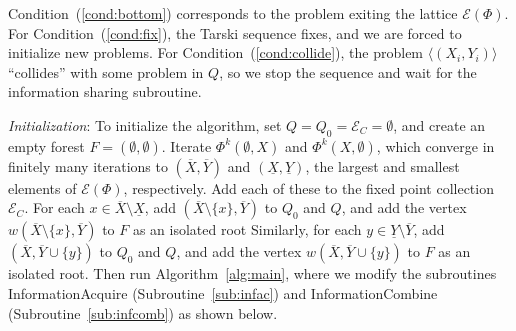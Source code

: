 \documentclass[11pt,reqno]{amsart}
\theoremstyle{definition}
\numberwithin{equation}{section}
\newcommand{\ol}{\overline}
\newcommand{\ul}{\underline}
\newcommand{\lag}{\langle}
\newcommand{\rag}{\rangle}
\newcommand{\fix}{\mathcal{E}}
\newcommand{\acto}{Q_0}
\newcommand{\act}{Q}
\newcommand{\forest}{F}
\newcommand{\fixfind}{\mathcal{E}_C}
\newcommand{\topx}{\ol{X}}
\newcommand{\topy}{\ol{Y}}
\newcommand{\botx}{\ul{X}}
\newcommand{\boty}{\ul{Y}}
\begin{document}
Condition~(\ref{cond:bottom}) corresponds to the problem exiting the lattice $\fix(\Phi)$. 
For Condition~(\ref{cond:fix}), the Tarski sequence fixes, and we are forced to initialize new problems.
For Condition~(\ref{cond:collide}), the problem $\lag (X_i, Y_i) \rag$ ``collides'' with some problem in $\act$, so we stop the sequence and wait for the information sharing subroutine.

\emph{Initialization}: To initialize the algorithm, set $\act = \acto = \fixfind = \emptyset$, and create an empty forest $\forest = (\emptyset,\emptyset)$.
Iterate $\Phi^k(\emptyset,X)$ and $\Phi^k(X, \emptyset)$, which converge in finitely many iterations to $(\topx, \topy)$ and $(\botx,\boty)$, the largest and smallest elements of $\fix(\Phi)$, respectively.
Add each of these to the fixed point collection $\fixfind$.
For each $x \in \topx \setminus \botx$, add $(\topx \setminus \{x\}, \topy)$ to $\acto$ and $\act$, and add the vertex $w(\topx \setminus \{x\}, \topy)$ to $\forest$ as an isolated root
Similarly, for each $y \in \boty \setminus \topy$, add $(\topx, \topy \cup \{y\})$ to $\acto$ and $\act$, and add the vertex $w(\topx, \topy \cup \{y\})$ to $\forest$ as an isolated root.
Then run Algorithm~\ref{alg:main}, where we modify the subroutines InformationAcquire (Subroutine~\ref{sub:infac}) and InformationCombine (Subroutine~\ref{sub:infcomb}) as shown below.
\end{document}

